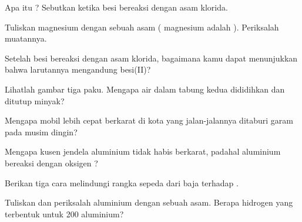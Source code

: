 \begin{exercise}[$\star$]\label{exo:g9:metals-acids-corrosion:4}
Apa itu ? Sebutkan  ketika besi bereaksi
dengan asam klorida.
\end{exercise}

\begin{exercise}[$\star\star$]\label{exo:g9:metals-acids-corrosion:5}
Tuliskan  magnesium dengan   sebuah asam
( magnesium adalah ). Periksalah muatannya.
\end{exercise}

\begin{exercise}[$\star\star$]\label{exo:g9:metals-acids-corrosion:6}
Setelah besi bereaksi dengan asam klorida, bagaimana kamu dapat
menunjukkan bahwa larutannya mengandung  besi(II)?
\end{exercise}

\begin{exercise}[$\star\star$]\label{exo:g9:metals-acids-corrosion:7}
Lihatlah gambar tiga paku. Mengapa air dalam tabung kedua dididihkan
dan ditutup minyak?
\end{exercise}

\begin{exercise}[$\star\star$]\label{exo:g9:metals-acids-corrosion:8}
Mengapa mobil lebih cepat berkarat di kota yang jalan-jalannya ditaburi
garam pada musim dingin?
\end{exercise}

\begin{exercise}[$\star\star$]\label{exo:g9:metals-acids-corrosion:9}
Mengapa kusen jendela aluminium tidak habis berkarat, padahal aluminium
bereaksi dengan oksigen ?
\end{exercise}

\begin{exercise}[$\star\star$]\label{exo:g9:metals-acids-corrosion:10}
Berikan tiga cara melindungi rangka sepeda dari baja terhadap .
\end{exercise}

\begin{exercise}[$\star\star\star$]\label{exo:g9:metals-acids-corrosion:11}
Tuliskan dan periksalah  aluminium dengan 
 sebuah asam. Berapa  hidrogen yang terbentuk untuk 200
 aluminium?
\end{exercise}

